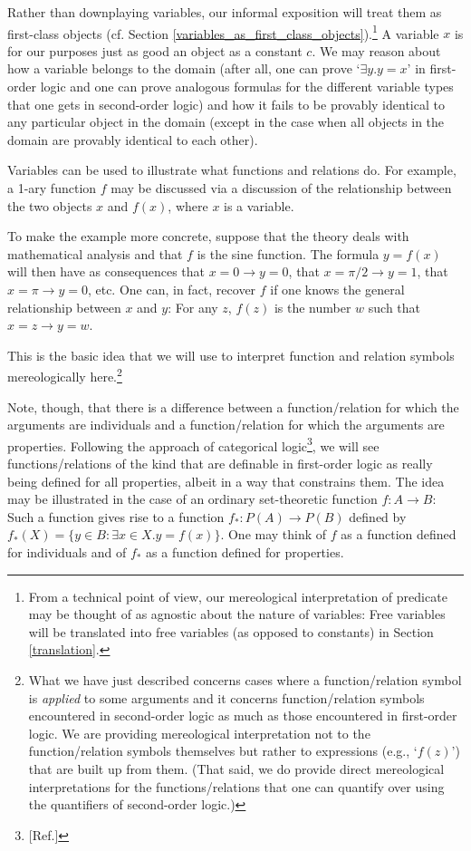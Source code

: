 \documentclass[12pt]{book}
\begin{document}
Rather than downplaying variables, our informal exposition will treat them as first-class objects (cf. Section \ref{variables_as_first_class_objects}).\footnote{From a technical point of view, our mereological interpretation of predicate may be thought of as agnostic about the nature of variables: Free variables will be translated into free variables (as opposed to constants) in Section \ref{translation}.} A variable $x$ is for our purposes just as good an object as a constant $c$. We may reason about how a variable belongs to the domain (after all, one can prove ‘$\exists y.y=x$’ in first-order logic and one can prove analogous formulas for the different variable types that one gets in second-order logic) and how it fails to be provably identical to any particular object in the domain (except in the case when all objects in the domain are provably identical to each other).

Variables can be used to illustrate what functions and relations do. For example, a 1-ary function $f$ may be discussed via a discussion of the relationship between the two objects $x$ and $f(x)$, where $x$ is a variable.

To make the example more concrete, suppose that the theory deals with mathematical analysis and that $f$ is the sine function. The formula $y = f(x)$ will then have as consequences that $x = 0 \rightarrow y = 0$, that $x = \pi / 2 \rightarrow y = 1$, that $x = \pi \rightarrow y = 0$, etc. One can, in fact, recover $f$ if one knows the general relationship between $x$ and $y$: For any $z$, $f(z)$ is the number $w$ such that $x = z \rightarrow y = w$.

This is the basic idea that we will use to interpret function and relation symbols mereologically here.\footnote{What we have just described concerns cases where a function/relation symbol is \textit{applied} to some arguments and it concerns function/relation symbols encountered in second-order logic as much as those encountered in first-order logic. We are providing mereological interpretation not to the function/relation symbols themselves but rather to expressions (e.g., `$f(z)$') that are built up from them. (That said, we do provide direct mereological interpretations for the functions/relations that one can quantify over using the quantifiers of second-order logic.)}

Note, though, that there is a difference between a function/relation for which the arguments are individuals and a function/relation for which the arguments are properties. Following the approach of categorical logic\footnote{[Ref.]}, we will see functions/relations of the kind that are definable in first-order logic as really being defined for all properties, albeit in a way that constrains them. The idea may be illustrated in the case of an ordinary set-theoretic function $f: A \rightarrow B$: Such a function gives rise to a function $f_*: P(A) \rightarrow P(B)$ defined by $f_*(X) = \{y \in B: \exists x \in X.y = f(x)\}$. One may think of $f$ as a function defined for individuals and of $f_*$ as a function defined for properties.
\end{document}
